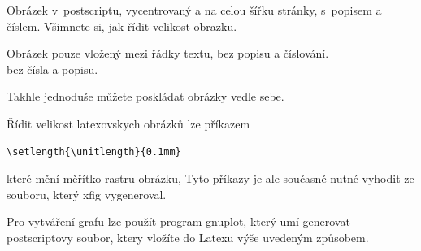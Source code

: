 \documentclass[12pt]{article}
\begin{document}
Obrázek v~postscriptu, vycentrovaný a na celou šířku stránky,
s~popisem a číslem. Všimnete si, jak řídit velikost obrazku.

Obrázek pouze vložený mezi řádky textu, bez popisu a číslování.\\


bez čísla a popisu.

Takhle jednoduše můžete poskládat obrázky vedle sebe.

Řídit velikost latexovskych obrázků lze příkazem
\begin{verbatim}
\setlength{\unitlength}{0.1mm}
\end{verbatim}
které mění měřítko rastru obrázku, Tyto příkazy je ale současně
nutné vyhodit ze souboru, který xfig vygeneroval.

Pro vytváření grafu lze použít program gnuplot, který umí generovat
postscriptovy soubor, ktery vložíte do Latexu výše uvedeným
způsobem.
\end{document}
